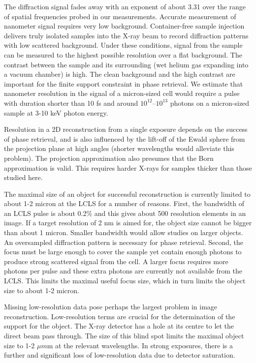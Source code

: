 The diffraction signal fades away with an exponent of  about 3.31 over the range of spatial frequencies probed in our measurements. Accurate measurement of nanometer signal requires very low background. Container-free sample injection delivers truly isolated samples into the X-ray beam to record diffraction patterns with low scattered background. Under these conditions, signal from the sample can be measured to the highest possible resolution over a flat background. The contrast between the sample and its surrounding (wet helium gas expanding into a vacuum chamber) is high. The clean background and the high contrast are important for the finite support constraint in phase retrieval. We estimate that nanometer resolution in the signal of a micron-sized cell would require a pulse with duration shorter than 10 fs and around $10^{12}$–$10^{13}$ photons on a micron-sized sample at 3-10 keV photon energy.

Resolution in a 2D reconstruction from a single exposure depends on the success of phase retrieval, and is also influenced by the lift-off of the Ewald sphere from the projection plane at high angles (shorter wavelengths would alleviate this problem). The projection approximation also presumes that the Born approximation is valid. This requires harder X-rays for samples thicker than those studied here.

The maximal size of an object for successful reconstruction is currently limited to about 1-2 micron at the LCLS for a number of reasons. 
First, the bandwidth of an LCLS pulse is about 0.2\% and this gives about 500 resolution elements in an image. If a target resolution of 2 nm is aimed for, the object size cannot be bigger than about 1 micron. Smaller bandwidth would allow studies on larger objects. An oversampled diffraction pattern is necessary for phase retrieval. 
Second, the focus must be large enough to cover the sample yet contain enough photons to produce strong scattered signal from the cell. A larger focus requires more photons per pulse and these extra photons are currently not available from the LCLS. This limits the maximal useful focus size, which in turn limits the object size to about 1-2 micron.

Missing low-resolution data pose perhaps the largest problem in image reconstruction. Low-resolution terms are crucial for the determination of the support for the object. The X-ray detector has a hole at its centre to let the direct beam pass through. The size of this blind spot limits the maximal object size to 1-2 $\mu m$m at the relevant wavelengths. In strong exposures, there is a further and significant loss of low-resolution data due to detector saturation.

